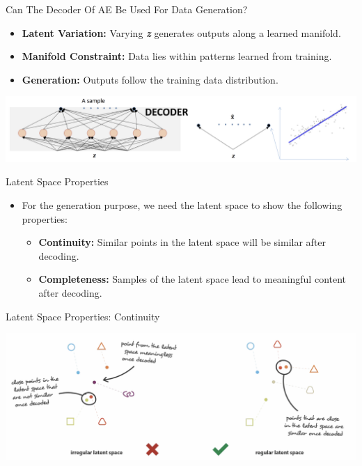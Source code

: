 \documentclass[serif, aspectratio=169]{beamer}
\begin{document}
\begin{frame}{Can The Decoder Of AE Be Used For Data Generation?}
     \begin{itemize}
            \item \textbf{\textcolor{deepblue}{Latent Variation:}} Varying \textbf{\textit{z}} generates outputs along a learned manifold.
            \item \textbf{\textcolor{deepblue}{Manifold Constraint:}} Data lies within patterns learned from training.
            \item \textbf{\textcolor{deepblue}{Generation:}} Outputs follow the training data distribution.
        \end{itemize}
        
    \vspace{0.5cm}
    
    \begin{center}
        \includegraphics[width=\textwidth]{pic/AE for data generation3.png}
    \end{center}
\end{frame}


\begin{frame}{Latent Space Properties}
    \begin{itemize}
        \item For the generation purpose, we need the latent space to show the following properties:
        \begin{itemize}
            \item \textbf{Continuity:} Similar points in the latent space will be similar after decoding.
            \item \textbf{Completeness:} Samples of the latent space lead to meaningful content after decoding.
        \end{itemize}
    \end{itemize}
\end{frame}

\begin{frame}{Latent Space Properties: Continuity}
      \begin{center}
        \includegraphics[width=\textwidth]{pic/Latent space property-Continuity.png} 
    \end{center}
\end{frame}
\end{document}
